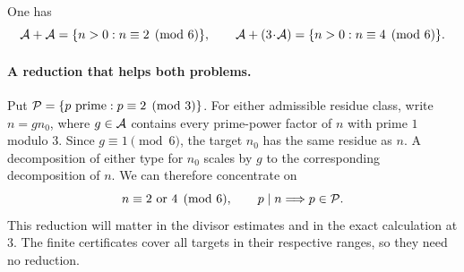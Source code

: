 \begin{theorem}\label{thm:main}
One has
\[
 \AA+\AA=\{n>0:n\equiv2\pmod6\},\qquad
 \AA+(3\!\cdot\!\AA)=\{n>0:n\equiv4\pmod6\}.
\]
\end{theorem}

\paragraph{A reduction that helps both problems.}
Put $\PP=\{p\text{ prime}:p\equiv2\pmod3\}$. For either admissible residue
class, write $n=gn_0$, where $g\in\AA$ contains every prime-power factor
of $n$ with prime $1$ modulo $3$. Since $g\equiv1\pmod6$, the target
$n_0$ has the same residue as $n$. A decomposition of either type for
$n_0$ scales by $g$ to the corresponding decomposition of $n$.
We can therefore concentrate on
\begin{equation}\label{eq:reduced}
n\equiv2\text{ or }4\pmod6,\qquad
p\mid n\Longrightarrow p\in\PP.
\end{equation}
This reduction will matter in the divisor estimates and in the exact
calculation at $3$. The finite certificates cover all targets in their
respective ranges, so they need no reduction.
